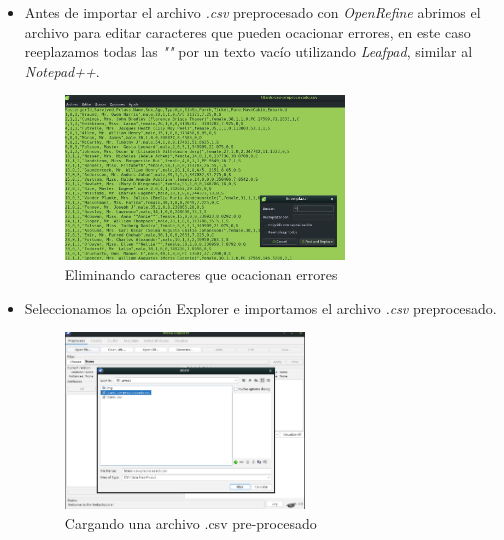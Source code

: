 \documentclass[12pt]{article}
\begin{document}
\begin{itemize}
                    \item Antes de importar el archivo \textit{.csv} preprocesado con \textit{OpenRefine} abrimos el archivo para editar caracteres que pueden ocacionar errores, en este caso reeplazamos todas las \textit{""} por un texto vacío utilizando \textit{Leafpad}, similar al \textit{Notepad++}.
                        \newpage
                        \begin{figure}[!h]
                            \centering
                            \includegraphics[width=0.7\textwidth]{img/weka-2.png}
                            \caption{Eliminando caracteres que ocacionan errores}
                        \end{figure}

                    \item Seleccionamos la opción Explorer e importamos el archivo \textit{.csv} preprocesado.
                        \begin{figure}[!h]
                            \centering
                            \includegraphics[width=0.6\textwidth]{img/weka-3.png}
                            \caption{Cargando una archivo .csv pre-procesado}
                        \end{figure}
                    

\end{itemize}
\end{document}
